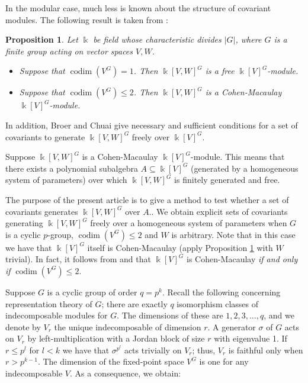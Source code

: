 \documentclass[a4paper]{amsart}
\newcommand{\kk}{\Bbbk}
\def\codim{\operatorname{codim}}
\newtheorem{prop}[Lemma]{Proposition}
\newtheorem*{Corollary of Conjecture}{Corollary of Conjecture}
\theoremstyle{definition}
\theoremstyle{remark}
\theoremstyle{Acknowledgments}
\begin{document}
In the modular case, much less is known about the structure of covariant modules. The following result is taken from \cite{BroerChuaiRelative}:

\begin{prop}\label{broerchuaimain}
Let $\kk$ be field whose characteristic divides $|G|$, where $G$  is a finite group acting on vector spaces $V,W$. 

\begin{itemize}
\item Suppose that $\codim(V^G) = 1$. Then $\kk[V,W]^G$ is a free $\kk[V]^G$-module.

\item Suppose that $\codim(V^G) \leq 2$. Then $\kk[V,W]^G$ is a Cohen-Macaulay $\kk[V]^G$-module.
\end{itemize}
\end{prop}

In addition, Broer and Chuai give necessary and sufficient conditions for a set of covariants to generate $\kk[V,W]^G$ freely over $\kk[V]^G$. 

Suppose $\kk[V,W]^G$ is a Cohen-Macaulay $\kk[V]^G$-module. This means that there exists a polynomial subalgebra $A \subseteq \kk[V]^G$ (generated by a homogeneous system of parameters) over which $\kk[V,W]^G$ is finitely generated and free. 

The purpose of the present article is to give a method to test whether a set of covariants generates $\kk[V,W]^G$ over $A$.. We obtain explicit sets of covariants generating $\kk[V,W]^G$ freely over a homogeneous system of parameters when $G$ is a cyclic $p$-group, $\codim(V^G) \leq 2$ and $W$ is arbitrary. Note that in this case we have that $\kk[V]^G$ itself is Cohen-Macaulay (apply Proposition \ref{broerchuaimain} with $W$ trivial). In fact, it follows from \cite{Ellingsrud} and \cite{FleischmannCohomConnectivity} that $\kk[V]^G$ is Cohen-Macaulay \emph{if and only if} $\codim(V^G) \leq 2$.

Suppose $G$ is a cyclic group of order $q = p^k$. Recall the following concerning representation theory of $G$; there are exactly $q$ isomorphism classes of indecomposable modules for $G$. The dimensions of these are $1,2,3, \ldots, q$, and we denote by $V_r$ the unique indecomposable of dimension $r$. A generator $\sigma$ of $G$ acts on $V_r$ by left-multiplication with a Jordan block of size $r$ with eigenvalue 1. If $r \leq p^l$ for $l<k$ we have that $\sigma^{p^l}$ acts trivially on $V_r$; thus, $V_r$ is faithful only when $r>p^{k-1}$. The dimension of the fixed-point space $V^G$ is one for any indecomposable $V$. As a consequence, we obtain:
\end{document}
